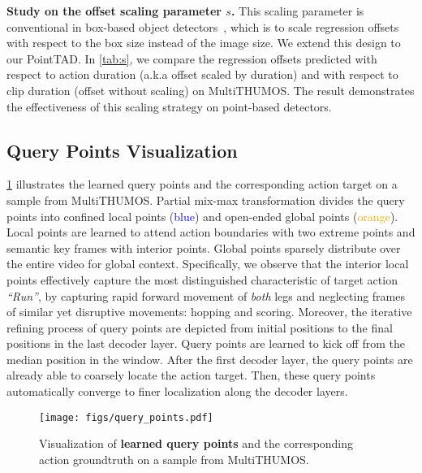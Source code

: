 \documentclass{article}
\renewcommand{\paragraph}[1]{\vspace{1.25mm}\noindent\textbf{#1}}
\begin{document}
\paragraph{{Study on the offset scaling parameter $s$.}}
{This scaling parameter is conventional in box-based object detectors~\cite{DBLP:conf/nips/RenHGS15,DBLP:conf/cvpr/CaiV18,DBLP:conf/cvpr/SunZJKXZTLYW021}, which is to scale regression offsets with respect to the box size instead of the image size. We extend this design to our PointTAD. In \cref{tab:s}, we compare the regression offsets predicted with respect to action duration (a.k.a offset scaled by duration) and with respect to clip duration (offset without scaling) on MultiTHUMOS. The result demonstrates the effectiveness of this scaling strategy on point-based detectors.}

\vspace{-0.2em}
\subsection{Query Points Visualization}
\vspace{-0.5em}
\cref{fig:query_points} illustrates the learned query points and the corresponding action target on a sample from MultiTHUMOS. Partial mix-max transformation divides the query points into confined local points (\textcolor{blue}{blue}) and open-ended global points (\textcolor{orange}{orange}). Local points are learned to attend action boundaries with two extreme points and semantic key frames with interior points. Global points sparsely distribute over the entire video for global context. Specifically, we observe that the interior local points effectively capture the most distinguished characteristic of target action {\em ``Run''}, by capturing rapid forward movement of {\em both} legs and neglecting frames of similar yet disruptive movements: hopping and scoring. Moreover, the iterative refining process of query points are depicted from initial positions to the final positions in the last decoder layer. Query points are learned to kick off from the median position in the window. After the first decoder layer, the query points are already able to coarsely locate the action target. Then, these query points automatically converge to finer localization along the decoder layers.

\begin{figure}
  \centering
  \vspace{-4mm}
  \texttt{[image: figs/query\_points.pdf]}
  \caption{Visualization of {\bf learned query points} and the corresponding action groundtruth on a sample from MultiTHUMOS. }
  \label{fig:query_points}
  \vspace{-5mm}
\end{figure}
\end{document}
